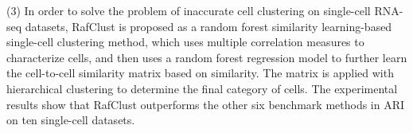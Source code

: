 \begin{abstracten}

(3) In order to solve the problem of inaccurate cell clustering on single-cell RNA-seq datasets, 
RafClust is proposed as a random forest similarity learning-based single-cell clustering method, 
which uses multiple correlation measures to characterize cells, 
and then uses a random forest regression model to further learn the cell-to-cell similarity matrix based on similarity. 
The matrix is applied with hierarchical clustering to determine the final category of cells. 
The experimental results show that RafClust outperforms the other six benchmark methods in ARI on ten single-cell datasets.



\end{abstracten}
